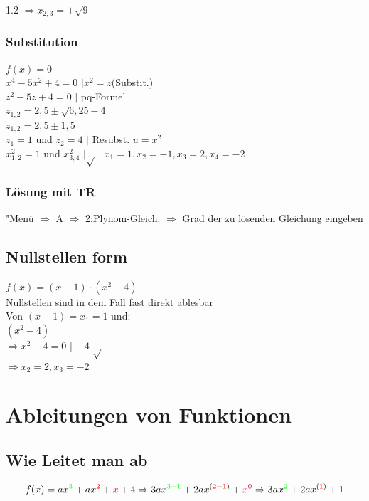 \documentclass{article}
\newcommand{\Zeilenabstand}{1.2}
\begin{document}
\begin{spacing}{\Zeilenabstand}
    $\Rightarrow x_{2,3} = \pm \sqrt{9}$

    \subsubsection{Substitution}   
    $f(x)=0$\\
    $x^4-5x^2+4 = 0$ $\vert x^2 = z$(Substit.)\\
    $z^2-5z+4=0$ $\vert$ pq-Formel\\
    $z_{1,2} = 2,5 \pm \sqrt{6,25-4}$\\
    $z_{1,2} = 2,5 \pm 1,5$\\
    $z_1 = 1$ und $z_2 = 4$ $\vert$ Resubst. $u=x^2$\\
    $x^2_{1,2} = 1$ und $x^2_{3,4}$ $\vert \sqrt{\ \ }$
    $x_1 = 1,x_2=-1,x_3=2,x_4=-2$


    \subsubsection{Lösung mit TR}
    "Menü $\Rightarrow$ A $\Rightarrow$ 2:Plynom-Gleich. $\Rightarrow$ Grad der zu lösenden Gleichung eingeben

    \subsection{Nullstellen form}
    $f(x)= (x-1) \cdot (x^2-4)$\\
    Nullstellen sind in dem Fall fast direkt ablesbar\\
    Von $(x-1) = x_1=1$ und: \\
    $(x^2-4) $\\
    $\Rightarrow x^2 - 4 = 0$ $\vert -4$ $ \sqrt{\ \ }$\\
    $\Rightarrow x_2=2,x_3=-2$
    \newpage











        \section{Ableitungen von Funktionen}
            \subsection{Wie Leitet man ab}
                \begin{equation}
                    f(x)= ax^{{\color{green}3}}+ax^{{\color{red}2}}+{\color{purple}x}+4 \Rightarrow 3ax^{\color{green}3-1}+2ax^{({\color{red}2-1})}+{\color{purple}x^{0}} \Rightarrow 3ax^{\color{green}2}+2ax^{({\color{red}1})}+{\color{purple}1}
                \end{equation}


\end{spacing}
\end{document}
